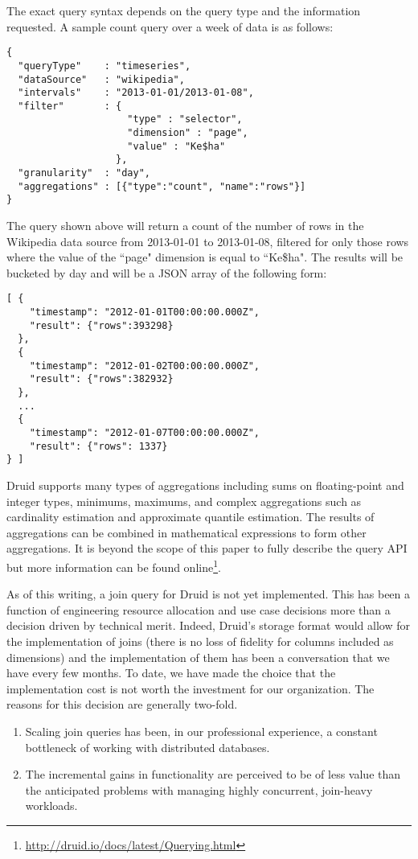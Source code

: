 \documentclass{sig-alternate-2013}
\begin{document}
The exact query syntax depends on the query type and the information requested.
A sample count query over a week of data is as follows:
{\scriptsize\begin{verbatim}
{
  "queryType"    : "timeseries",
  "dataSource"   : "wikipedia",
  "intervals"    : "2013-01-01/2013-01-08",
  "filter"       : {
                     "type" : "selector",
                     "dimension" : "page",
                     "value" : "Ke$ha"
                   },
  "granularity"  : "day",
  "aggregations" : [{"type":"count", "name":"rows"}]
}
\end{verbatim}}
The query shown above will return a count of the number of rows in the Wikipedia data source
from 2013-01-01 to 2013-01-08, filtered for only those rows where the value of the ``page" dimension is
equal to ``Ke\$ha". The results will be bucketed by day and will be a JSON array of the following form:
{\scriptsize\begin{verbatim}
[ {
    "timestamp": "2012-01-01T00:00:00.000Z",
    "result": {"rows":393298}
  },
  {
    "timestamp": "2012-01-02T00:00:00.000Z",
    "result": {"rows":382932}
  },
  ...
  {
    "timestamp": "2012-01-07T00:00:00.000Z",
    "result": {"rows": 1337}
} ]
\end{verbatim}}

Druid supports many types of aggregations including sums on floating-point and integer types,
minimums, maximums, and complex aggregations such as cardinality estimation and
approximate quantile estimation. The results of aggregations can be combined
in mathematical expressions to form other aggregations. It is beyond the scope
of this paper to fully describe the query API but more information can be found
online\footnote{\href{http://druid.io/docs/latest/Querying.html}{http://druid.io/docs/latest/Querying.html}}.

As of this writing, a join query for Druid is not yet implemented. This has
been a function of engineering resource allocation and use case decisions more
than a decision driven by technical merit. Indeed, Druid's storage format
would allow for the implementation of joins (there is no loss of fidelity for
columns included as dimensions) and the implementation of them has been a
conversation that we have every few months. To date, we have made the choice
that the implementation cost is not worth the investment for our organization.
The reasons for this decision are generally two-fold.

\begin{enumerate}
\item Scaling join queries has been, in our professional experience, a constant bottleneck of working with distributed databases.
\item The incremental gains in functionality are perceived to be of less value than the anticipated problems with managing highly concurrent, join-heavy workloads.
\end{enumerate}
\end{document}
